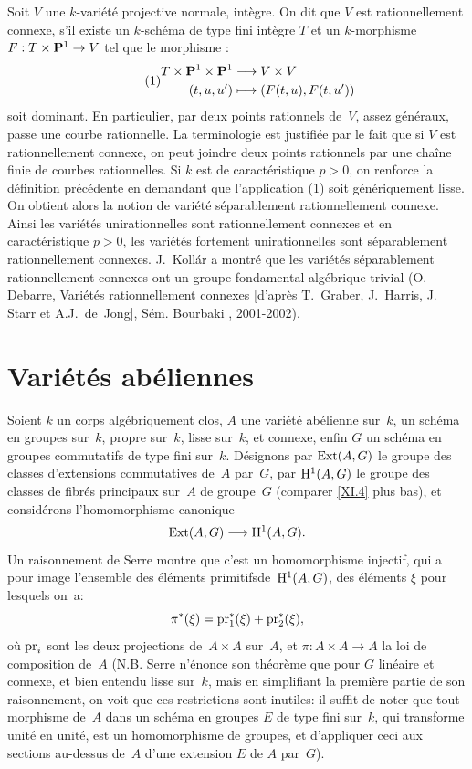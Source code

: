 \begin{remarques}
Soit $V$ une $k$-vari\'et\'e projective normale, int\`egre. On dit que $V$ est
rationnellement connexe, s'il existe un $k$-sch\'ema de type fini int\`egre
$T$ et un $k$-morphisme $F : T\times\PP^1\to V$ tel que le morphisme :
\begin{equation}\tag*{(1)}
\begin{split}
T \times\PP^1\times\PP^1&\to V\times V\\
(t, u, u')&\mto(F(t,u), F(t,u'))
\end{split}
\end{equation}
soit dominant. En particulier, par deux points rationnels de~$V$,
assez g\'en\'eraux, passe une courbe rationnelle. La terminologie est
justifi\'ee par le fait que si $V$ est rationnellement connexe, on peut
joindre deux points rationnels par une cha\^ine finie de courbes
rationnelles. Si $k$ est de caract\'eristique $p>0$, on renforce la
d\'efinition pr\'ec\'edente en demandant que l'application (1) soit
g\'en\'eriquement lisse. On obtient alors la notion de vari\'et\'e
s\'eparablement rationnellement connexe. Ainsi les vari\'et\'es
unirationnelles sont rationnellement connexes et en caract\'eristique
$p>0$, les vari\'et\'es fortement unirationnelles sont s\'eparablement
rationnellement connexes. J.\, Koll\'ar a montr\'e que les vari\'et\'es
s\'eparablement rationnellement connexes ont un groupe fondamental
alg\'ebrique trivial (\cf O.\, Debarre, Vari\'et\'es rationnellement
connexes [d'apr\`es T.\, Graber, J.\, Harris, J.\, Starr et A.J.\, de~Jong],
S\'em. Bourbaki , 2001-2002).\rcrochetbf
\end{remarques}

\section{Vari\'et\'es ab\'eliennes}
\label{XI.2}
Soient $k$ un corps alg\'ebriquement clos, $A$ une vari\'et\'e
ab\'elienne sur~$k$, \ie un sch\'ema en groupes sur~$k$, propre
sur~$k$, lisse sur~$k$, et connexe, enfin $G$ un sch\'ema en groupes
commutatifs de type fini sur~$k$. D\'esignons par $\operatorname{Ext}(A,G)$ le
groupe des classes d'extensions commutatives de~$A$ par~$G$, par
$\mathrm{H}^1(A,G)$ le groupe des classes de fibr\'es principaux sur~$A$ de
groupe~$G$ (comparer \No \ref{XI.4} plus bas), et consid\'erons
l'homomorphisme canonique
$$
\Ext(A,G)\to \H^1(A,G)\quoi.
$$
Un
raisonnement de Serre \cite[chap.\, VII, th.\, 5]{XI.5} montre que c'est un
homomorphisme injectif, qui a pour image l'ensemble des
\og \'el\'ements primitifs\fg de~$\mathrm{H}^1(A,G)$, \ie des
\'el\'ements $\xi$ pour lesquels on~a:
$$
\pi^*(\xi) = \mathrm{pr}_1^*(\xi) + \mathrm{pr}_2^*(\xi),
$$
o\`u $\mathrm{pr}_i$ sont les deux projections de~$A\times A$
sur~$A$, et $\pi\colon A\times A\to A$ la loi de composition de~$A$
(N.B. Serre n'\'enonce son th\'eor\`eme que pour $G$
lin\'eaire et connexe, et bien entendu lisse sur~$k$, mais en
simplifiant la premi\`ere partie de son raisonnement, on voit que
ces restrictions sont inutiles: il suffit de noter que tout morphisme
de~$A$ dans un sch\'ema en groupes $E$ de type fini sur~$k$, qui
transforme unit\'e en unit\'e, est un homomorphisme de groupes, et
d'appliquer ceci aux sections au-dessus de~$A$ d'une extension $E$ de
$A$ par~$G$).

